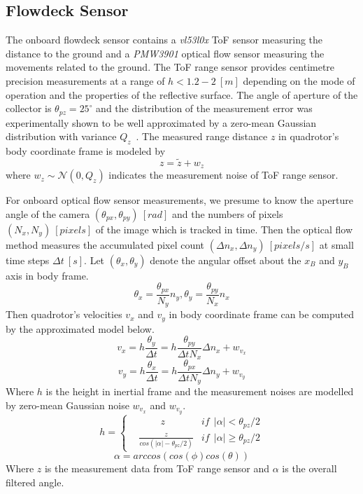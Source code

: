 \documentclass[letterpaper, 10 pt, conference]{ieeeconf}  %
\begin{document}
\subsection{Flowdeck Sensor}
The onboard flowdeck sensor contains a \textit{vl53l0x} ToF sensor measuring the distance to the ground and a \textit{PMW3901} optical flow sensor measuring the movements related to the ground. The ToF range sensor provides centimetre precision measurements at a range of $h<1.2-2~[m]$ depending on the mode of operation and the properties of the reflective surface. The angle of aperture of the collector is $\theta_{pz}=25^{\circ}$ and the distribution of the measurement error was experimentally shown to be well approximated by a zero-mean Gaussian distribution with variance $Q_z$~\cite{greiff2017modelling}. The measured range distance $z$ in quadrotor's body coordinate frame is modeled by
\begin{equation}
	z=\tilde{z}+w_z
\end{equation}
where $w_z\sim\mathcal N(0,Q_z)$ indicates the measurement noise of ToF range sensor.

For onboard optical flow sensor measurements, we presume to know the aperture angle of the camera $\left(\theta_{px},\theta_{py}\right)~[rad]$ and the numbers of pixels $\left(N_x,N_y\right)~[pixels]$ of the image which is tracked in time. Then the optical flow method measures the accumulated pixel count $\left(\Delta n_x,\Delta n_y\right)~[pixels/s]$ at small time steps $\Delta t~[s]$. Let $\left(\theta_x,\theta_y\right)$ denote the angular offset about the $x_B$ and $y_B$ axis in body frame.
\begin{equation}
\theta_x=\frac{\theta_{px}}{N_y}n_y, \theta_y=\frac{\theta_{py}}{N_x}n_x
\end{equation}
Then quadrotor's velocities $v_x$ and $v_y$ in body coordinate frame can be computed by the approximated model below.
\begin{equation}
v_x=h\frac{\theta_y}{\Delta t}=h\frac{\theta_{py}}{\Delta tN_x}\Delta n_x + w_{v_x}
\end{equation}
\begin{equation}
v_y=h\frac{\theta_x}{\Delta t}=h\frac{\theta_{px}}{\Delta tN_y}\Delta n_y + w_{v_y}
\end{equation}
Where $h$ is the height in inertial frame and the measurement noises are modelled by zero-mean Gaussian noise $w_{v_x}$ and $w_{v_y}$.
\begin{equation}
h=\left \{
  \begin{split}
    	&~~~~~~~~~~z &if ~~|\alpha|<\theta_{pz}/2     \\                 
 	 &\frac{z}{cos(|\alpha|-\theta_{pz}/2)} &if ~~|\alpha|\geq\theta_{pz}/2 
  \end{split}
\right.  
\end{equation}
\begin{equation}
\alpha=arccos\left(cos(\phi)cos(\theta)\right)
\end{equation}
Where $z$ is the measurement data from ToF range sensor and $\alpha$ is the overall filtered angle.
\end{document}

